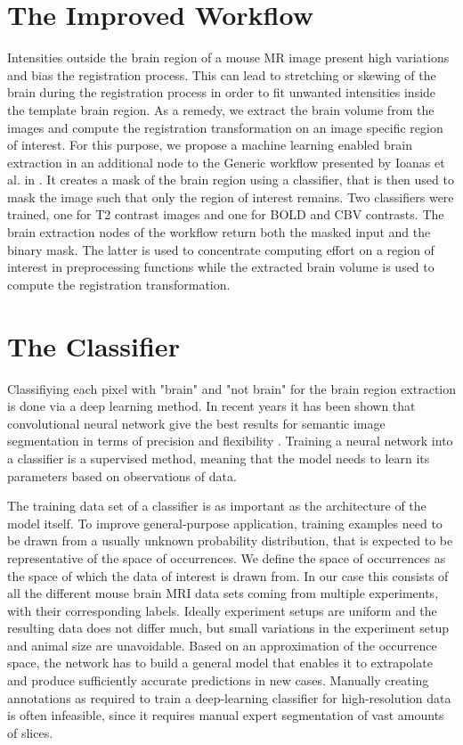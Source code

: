 \section{The Improved Workflow}

Intensities outside the brain region of a mouse MR image present high variations and bias the registration process.
This can lead to stretching or skewing of the brain during the registration process in order to fit unwanted intensities inside the template brain region.
As a remedy, we extract the brain volume from the images and compute the registration transformation on an image specific region of interest.
For this purpose, we propose a machine learning enabled brain extraction in an additional node to the Generic workflow presented by Ioanas et al. in \cite{ioanas_optimized_2019}.
It creates a mask of the brain region using a classifier, that is then used to mask the image such that only the region of interest remains.
Two classifiers were trained, one for T2 contrast images and one for BOLD \cite{bold} and CBV \cite{cbv} contrasts.
The brain extraction nodes of the workflow return both the masked input and the binary mask.
The latter is used to concentrate computing effort on a region of interest in preprocessing functions while the extracted brain volume is used to compute the registration transformation.

\section{The Classifier} \label{sec:Convolutional Neural Networks}
Classifiying each pixel with "brain" and "not brain" for the brain region extraction is done via a deep learning method.
In recent years it has been shown that convolutional neural network give the best results for semantic image segmentation in terms of precision and flexibility \cite{geng_survey_2018, ronneberger_u-net:_2015}.
Training a neural network into a classifier is a supervised method, meaning that the model needs to learn its parameters based on observations of data.

The training data set of a classifier is as important as the architecture of the model itself.
To improve general-purpose application, training examples need to be drawn from a usually unknown probability distribution, that is expected to be representative of the space of occurrences.
We define the space of occurrences as the space of which the data of interest is drawn from.
In our case this consists of all the different mouse brain MRI data sets coming from multiple experiments, with their corresponding labels.
Ideally experiment setups are uniform and the resulting data does not differ much, but small variations in the experiment setup and animal size are unavoidable.
Based on an approximation of the occurrence space, the network has to build a general model that enables it to extrapolate and produce sufficiently accurate predictions in new cases.
Manually creating annotations as required to train a deep-learning classifier for high-resolution data is often infeasible, since it requires manual expert segmentation of vast amounts of slices.

